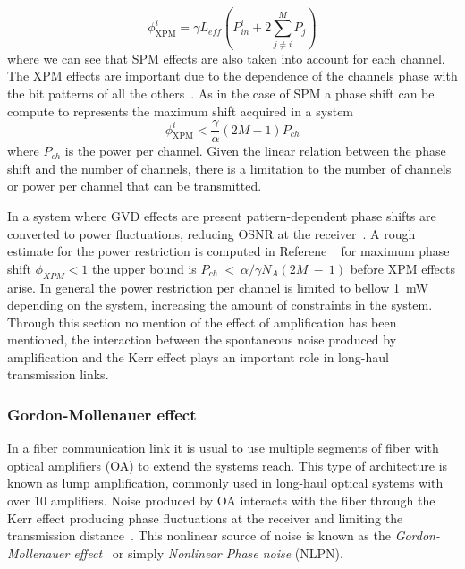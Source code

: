\begin{equation}
\phi^i_{\text{XPM}}=\gamma L_{eff}\left(P^i_{in}+2\sum^M_{j\ne i}P_j\right)
\end{equation}
where we can see that SPM effects are also taken into account for each channel. The XPM  effects are important due to the dependence of the channels phase with the bit patterns of all the others~\cite{agrawal2001applications}. As in the case of SPM a phase shift can be compute to represents the maximum  shift acquired in a system 
\begin{equation}
\phi^i_{\text{XPM}}<\frac{\gamma}{\alpha}(2M-1)P_{ch}
\end{equation}
where $P_{ch}$ is the power per channel. Given the linear relation between the phase shift and the number of channels, there is a limitation to the number of channels or power per channel that can be transmitted.

 In a system where GVD effects are present pattern-dependent phase shifts are converted to power fluctuations, reducing OSNR at the receiver~\cite{agrawal2001applications}.  A rough estimate for the power restriction is computed in Referene ~\cite{le2015advanced} for maximum phase shift $\phi_{XPM}<1$ the upper bound is  $P_{ch}~<~\alpha/\gamma N_{A}(2M~-~1)$ before XPM effects arise. In general the power restriction per channel is limited to bellow 1~mW depending on the system, increasing the amount of constraints in the system. Through this section no mention of the effect of amplification has been mentioned, the interaction between the spontaneous noise produced by amplification and the Kerr effect plays an important role in long-haul transmission links. 


\subsubsection{Gordon-Mollenauer effect}

In a fiber communication link it is usual to use multiple segments of fiber with optical amplifiers (OA) to extend the systems reach. This type of architecture is known as lump amplification, commonly used in long-haul optical systems with over 10 amplifiers. Noise produced by OA interacts with the fiber through the Kerr effect  producing phase fluctuations at the receiver and limiting the transmission distance~\cite{agrawal2001applications}. This nonlinear source of noise is known as the \textit{Gordon-Mollenauer effect}~\cite{gordon1990phase} or simply \textit{Nonlinear Phase noise} (NLPN). 

